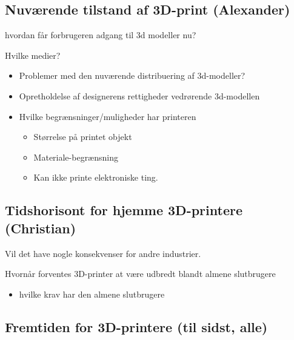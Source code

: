 \subsection{Nuværende tilstand af 3D-print (Alexander)} %
\label{sub:nuv_rende_tilstand_af_3d_print_alexander_}

hvordan får forbrugeren adgang til 3d modeller nu?

Hvilke medier?

\begin{itemize}
	\item Problemer med den nuværende distribuering af 3d-modeller?
	\item Opretholdelse af designerens rettigheder vedrørende 3d-modellen
\end{itemize}




\begin{itemize}
	\item Hvilke begrænsninger/muligheder har printeren
	\begin{itemize}
		\item Størrelse på printet objekt
		\item Materiale-begrænsning
		\item Kan ikke printe elektroniske ting.
	\end{itemize}
\end{itemize}



\subsection{Tidshorisont for hjemme 3D-printere (Christian)} %
\label{sub:tidshorisont_for_hjemme_3d_printere_senere_}

Vil det have nogle konsekvenser for andre industrier.

Hvornår forventes 3D-printer at være udbredt blandt almene slutbrugere

\begin{itemize}
	\item hvilke krav har den almene slutbrugere
\end{itemize}


\subsection{Fremtiden for 3D-printere (til sidst, alle)} %
\label{sub:fremtiden_for_3d_printere_til_sidst_alle_}

